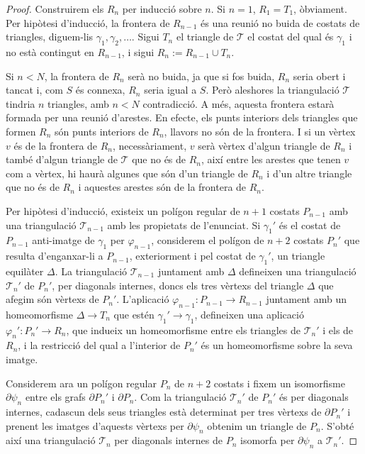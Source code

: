 \documentclass[../main.tex]{subfiles}
\begin{document}
\begin{proof}
Construirem els $R_n$ per inducció sobre $n$. Si $n=1$, $R_1 = T_1$, òbviament. Per hipòtesi d'inducció, la frontera de $R_{n-1}$ és una reunió no buida de costats de triangles, diguem-lis $\gamma_1,\gamma_2,\ldots$. Sigui $T_n$ el triangle de $\mathcal{T}$ el costat del qual és $\gamma_1$ i no està contingut en $R_{n-1}$, i sigui $R_n:=R_{n-1}\cup T_n$. 

Si $n<N$, la frontera de $R_n$ serà no buida, ja que si fos buida, $R_n$ seria obert i tancat i, com $S$ és connexa, $R_n$ seria igual a $S$. Però aleshores la triangulació $\mathcal{T}$ tindria $n$ triangles, amb $n<N$ contradicció. A més, aquesta frontera estarà formada per una reunió d'arestes. En efecte, els punts interiors dels triangles que formen $R_n$ són punts interiors de $R_n$, llavors no són de la frontera. I si un vèrtex $v$ és de la frontera de $R_n$, necessàriament, $v$ serà vèrtex d'algun triangle de $R_n$ i també d'algun triangle de $\mathcal{T}$ que no és de $R_n$, així entre les arestes que tenen $v$ com a vèrtex, hi haurà algunes que són d'un triangle de $R_n$ i d'un altre triangle que no és de $R_n$ i aquestes arestes són de la frontera de $R_n$.

Per hipòtesi d'inducció, existeix un polígon regular de $n+1$ costats $P_{n-1}$ amb una triangulació $\mathcal{T}_{n-1}$ amb les propietats de l'enunciat. Si $\gamma_1'$ és el costat de $P_{n-1}$ anti-imatge de $\gamma_1$ per $\varphi_{n-1}$, considerem el polígon de $n+2$ costats $P_n'$ que resulta d'enganxar-li a $P_{n-1}$, exteriorment i pel costat de $\gamma_1'$, un triangle equilàter $\Delta$. La triangulació $\mathcal{T}_{n-1}$ juntament amb $\Delta$ defineixen una triangulació $\mathcal{T}_n'$ de $P_n'$, per diagonals internes, doncs els tres vèrtexs del triangle $\Delta$ que afegim són vèrtexs de $P_n'$. L'aplicació $\varphi_{n-1}:P_{n-1}\rightarrow R_{n-1}$ juntament amb un homeomorfisme $\Delta\rightarrow T_n$ que estén $\gamma_1'\rightarrow \gamma_1$, defineixen una aplicació $\varphi_n':P_n'\rightarrow R_n$, que indueix un homeomorfisme entre els triangles de $\mathcal{T}_n'$ i els de $R_n$, i la restricció del qual a l'interior de $P_n'$ és un homeomorfisme sobre la seva imatge.

Considerem ara un polígon regular $P_n$ de $n+2$ costats i fixem un isomorfisme $\partial\psi_n$ entre els grafs $\partial P_n'$ i $\partial P_n$. Com la triangulació $\mathcal{T}_n'$ de $P_n'$ és per diagonals internes, cadascun dels seus triangles està determinat per tres vèrtexs de $\partial P_n'$ i prenent les imatges d'aquests vèrtexs per $\partial \psi_n$ obtenim un triangle de $P_n$. S'obté així una triangulació $\mathcal{T}_n$ per diagonals internes de $P_n$ isomorfa per $\partial\psi_n$ a $\mathcal{T}_n'$.


\end{proof}
\end{document}

